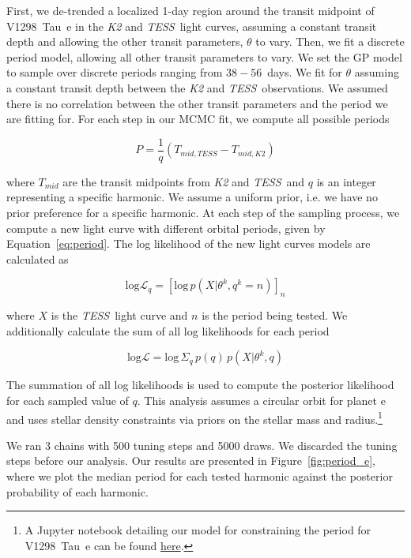 \documentclass[twocolumn]{aastex631}
\newcommand{\tess}{\textit{TESS}}
\newcommand{\planete}{V1298~Tau~e\xspace}
\begin{document}
First, we de-trended a localized 1-day region around the transit midpoint of \planete in the \textit{K2} and \tess\ light curves, assuming a constant transit depth and allowing the other transit parameters, $\theta$ to vary. Then, we fit a discrete period model, allowing all other transit parameters to vary. We set the GP model to sample over discrete periods ranging from $38 - 56$~days. We fit for $\theta$ assuming a constant transit depth between the \textit{K2} and \tess\ observations. We assumed there is no correlation between the other transit parameters and the period we are fitting for. For each step in our MCMC fit, we compute all possible periods

\begin{equation}\label{eq:period}
    P = \frac{1}{q} \left(T_{mid,TESS} - T_{mid, K2}\right)
\end{equation}

where $T_{mid}$ are the transit midpoints from \textit{K2} and \tess\ and $q$ is an integer representing a specific harmonic. We assume a uniform prior, i.e. we have no prior preference for a specific harmonic. At each step of the sampling process, we compute a new light curve with different orbital periods, given by Equation~\ref{eq:period}. The log likelihood of the new light curves models are calculated as

\begin{equation}
    \textrm{log} \mathcal{L}_q = \left[ \textrm{log}\, p \left( X | \theta^k, q^k = n \right) \right]_n
\end{equation}

where $X$ is the \tess\ light curve and $n$ is the period being tested. We additionally calculate the sum of all log likelihoods for each period 

\begin{equation}
    \textrm{log} \mathcal{L} = \textrm{log}\, \Sigma_q\, p(q)\, p(X|\theta^k, q) 
\end{equation}

The summation of all log likelihoods is used to compute the posterior likelihood for each sampled value of $q$. This analysis assumes a circular orbit for planet e and uses stellar density constraints via priors on the stellar mass and radius.\footnote{A Jupyter notebook detailing our model for constraining the period for \planete can be found \href{https://github.com/afeinstein20/v1298tau\_tess/blob/main/notebooks/V1298Tau\_e.ipynb}{here}.}

We ran 3 chains with 500 tuning steps and 5000 draws. We discarded the tuning steps before our analysis. Our results are presented in Figure~\ref{fig:period_e}, where we plot the median period for each tested harmonic against the posterior probability of each harmonic.
\end{document}

